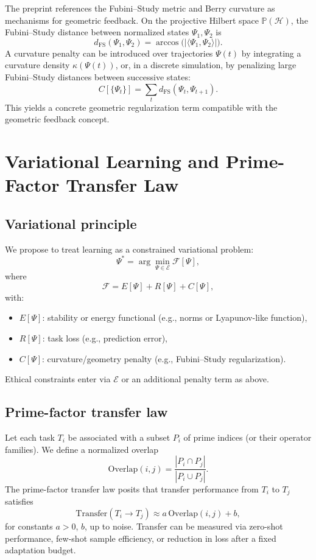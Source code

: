 \documentclass[11pt]{article}
\begin{document}
The preprint references the Fubini--Study metric and Berry curvature as mechanisms for geometric feedback. On the projective Hilbert space $\mathbb{P}(\mathcal{H})$, the Fubini--Study distance between normalized states $\Psi_1,\Psi_2$ is
\[
d_{\mathrm{FS}}(\Psi_1,\Psi_2)
=
\arccos\big(|\langle \Psi_1,\Psi_2\rangle|\big).
\]
A curvature penalty can be introduced over trajectories $\Psi(t)$ by integrating a curvature density $\kappa(\Psi(t))$, or, in a discrete simulation, by penalizing large Fubini--Study distances between successive states:
\[
C[\{\Psi_t\}] = \sum_t d_{\mathrm{FS}}(\Psi_t,\Psi_{t+1}).
\]
This yields a concrete geometric regularization term compatible with the geometric feedback concept.

\section{Variational Learning and Prime-Factor Transfer Law}

\subsection{Variational principle}

We propose to treat learning as a constrained variational problem:
\begin{equation}
\Psi^\ast = \arg\min_{\Psi \in \mathcal{E}} \mathcal{F}[\Psi],
\end{equation}
where
\begin{equation}
\mathcal{F} = E[\Psi] + R[\Psi] + C[\Psi],
\end{equation}
with:
\begin{itemize}[nosep]
\item $E[\Psi]$: stability or energy functional (e.g., norms or Lyapunov-like function),
\item $R[\Psi]$: task loss (e.g., prediction error),
\item $C[\Psi]$: curvature/geometry penalty (e.g., Fubini--Study regularization).
\end{itemize}
Ethical constraints enter via $\mathcal{E}$ or an additional penalty term as above.

\subsection{Prime-factor transfer law}

Let each task $T_i$ be associated with a subset $P_i$ of prime indices (or their operator families). We define a normalized overlap
\[
\mathrm{Overlap}(i,j) = \frac{|P_i\cap P_j|}{|P_i\cup P_j|}.
\]
The prime-factor transfer law posits that transfer performance from $T_i$ to $T_j$ satisfies
\begin{equation}
\mathrm{Transfer}(T_i\to T_j)
\approx
a\,\mathrm{Overlap}(i,j) + b,
\end{equation}
for constants $a>0$, $b$, up to noise. Transfer can be measured via zero-shot performance, few-shot sample efficiency, or reduction in loss after a fixed adaptation budget.
\end{document}
